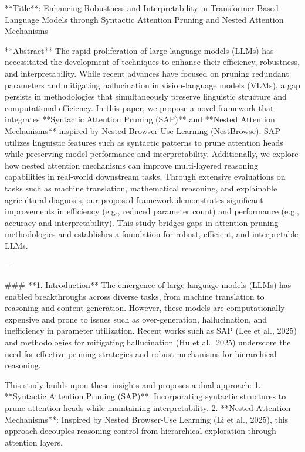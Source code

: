 **Title**: Enhancing Robustness and Interpretability in Transformer-Based Language Models through Syntactic Attention Pruning and Nested Attention Mechanisms  

**Abstract**  
The rapid proliferation of large language models (LLMs) has necessitated the development of techniques to enhance their efficiency, robustness, and interpretability. While recent advances have focused on pruning redundant parameters and mitigating hallucination in vision-language models (VLMs), a gap persists in methodologies that simultaneously preserve linguistic structure and computational efficiency. In this paper, we propose a novel framework that integrates **Syntactic Attention Pruning (SAP)** and **Nested Attention Mechanisms** inspired by Nested Browser-Use Learning (NestBrowse). SAP utilizes linguistic features such as syntactic patterns to prune attention heads while preserving model performance and interpretability. Additionally, we explore how nested attention mechanisms can improve multi-layered reasoning capabilities in real-world downstream tasks. Through extensive evaluations on tasks such as machine translation, mathematical reasoning, and explainable agricultural diagnosis, our proposed framework demonstrates significant improvements in efficiency (e.g., reduced parameter count) and performance (e.g., accuracy and interpretability). This study bridges gaps in attention pruning methodologies and establishes a foundation for robust, efficient, and interpretable LLMs.  

---

### **1. Introduction**  
The emergence of large language models (LLMs) has enabled breakthroughs across diverse tasks, from machine translation to reasoning and content generation. However, these models are computationally expensive and prone to issues such as over-generation, hallucination, and inefficiency in parameter utilization. Recent works such as SAP (Lee et al., 2025) and methodologies for mitigating hallucination (Hu et al., 2025) underscore the need for effective pruning strategies and robust mechanisms for hierarchical reasoning.  

This study builds upon these insights and proposes a dual approach:  
1. **Syntactic Attention Pruning (SAP)**: Incorporating syntactic structures to prune attention heads while maintaining interpretability.  
2. **Nested Attention Mechanisms**: Inspired by Nested Browser-Use Learning (Li et al., 2025), this approach decouples reasoning control from hierarchical exploration through attention layers.  

